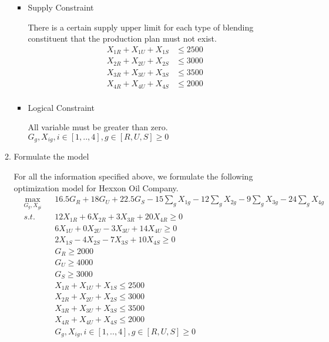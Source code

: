 \documentclass[11pt]{article}
\begin{document}
\begin{enumerate}
\begin{enumerate}
\begin{itemize}
        \item Supply Constraint \par
        There is a certain supply upper limit for each type of blending constituent that the production plan must not exist.
        \begin{align*}
            X_{1R} + X_{1U} + X_{1S} & \leq 2500 \\
            X_{2R} + X_{2U} + X_{2S} & \leq 3000 \\
            X_{3R} + X_{3U} + X_{3S} & \leq 3500 \\
            X_{4R} + X_{4U} + X_{4S} & \leq 2000 \\
        \end{align*}
        
        \item Logical Constraint \par
        All variable must be greater than zero.
        $G_g, X_{ig}, i \in [1,..,4], g \in [R, U, S] \geq 0$
    \end{itemize}
    \item Formulate the model\par
    For all the information specified above, we formulate the following optimization model for Hexxon Oil Company.
    \begin{align*}
        &\max_{G_g, X_{gi}} & & 16.5 G_R + 18 G_U + 22.5 G_S - 15\sum_g X_{1g} - 12 \sum_g X_{2g} - 9 \sum_g X_{3g} - 24\sum_g X_{4g} \\
        &s.t. && 12X_{1R} + 6X_{2R} + 3X_{3R} + 20X_{4R} \geq 0  \\
            &&&   6X_{1U} + 0X_{2U} - 3X_{3U} + 14X_{4U} \geq 0 \\
            &&&   2X_{1S} - 4X_{2S} - 7X_{3S} + 10X_{4S} \geq 0 \\
            &&& G_R \geq 2000 \\
            &&& G_U \geq 4000 \\
            &&& G_S \geq 3000 \\ 
            &&& X_{1R} + X_{1U} + X_{1S}  \leq 2500 \\
            &&& X_{2R} + X_{2U} + X_{2S}  \leq 3000 \\
            &&& X_{3R} + X_{3U} + X_{3S}  \leq 3500 \\
            &&& X_{4R} + X_{4U} + X_{4S}  \leq 2000 \\
            &&& G_g, X_{ig}, i \in [1,..,4], g \in [R, U, S] \geq 0
    \end{align*}
\end{enumerate}


\end{enumerate}
\end{document}
